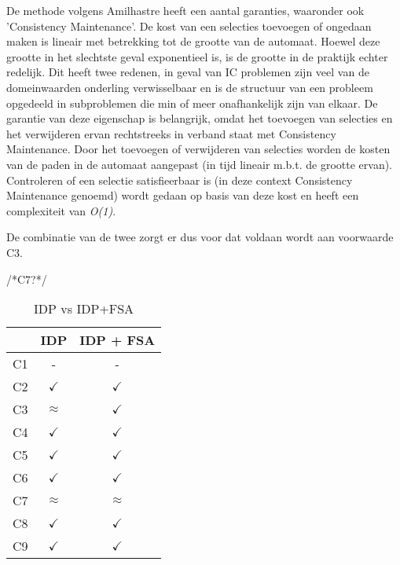 De methode volgens Amilhastre heeft een aantal garanties, waaronder ook 'Consistency Maintenance'. De kost van een selecties toevoegen of ongedaan maken is lineair met betrekking tot de grootte van de automaat. Hoewel deze grootte in het slechtste geval exponentieel is, is de grootte in de praktijk echter redelijk. Dit heeft twee redenen, in geval van IC problemen zijn veel van de domeinwaarden onderling verwisselbaar en is de structuur van een probleem opgedeeld in subproblemen die min of meer onafhankelijk zijn van elkaar. De garantie van deze eigenschap is belangrijk, omdat het toevoegen van selecties en het verwijderen ervan rechtstreeks in verband staat met Consistency Maintenance. Door het toevoegen of verwijderen van selecties worden de kosten van de paden in de automaat aangepast (in tijd lineair m.b.t. de grootte ervan). Controleren of een selectie satisfieerbaar is (in deze context Consistency Maintenance genoemd) wordt gedaan op basis van deze kost en heeft een complexiteit van \textit{O(1)}. 

De combinatie van de twee zorgt er dus voor dat voldaan wordt aan voorwaarde C3. 

/*C7?*/

\begin{table}[]
\centering
\caption{IDP vs IDP+FSA}
\label{criteria}
\begin{tabular}{|l|c|c|}
\hline
 & IDP & IDP + FSA \\ \hline
C1 & - & - \\ \hline
C2 & $\checkmark$ & $\checkmark$ \\ \hline
C3 & $\approx$ & $\checkmark$ \\ \hline
C4 & $\checkmark$ & $\checkmark$ \\ \hline
C5 & $\checkmark$ & $\checkmark$ \\ \hline
C6 & $\checkmark$ & $\checkmark$ \\ \hline
C7 & $\approx$ & $\approx$ \\ \hline
C8 & $\checkmark$ & $\checkmark$ \\ \hline
C9 & $\checkmark$ & $\checkmark$ \\ \hline
\end{tabular}
\end{table}